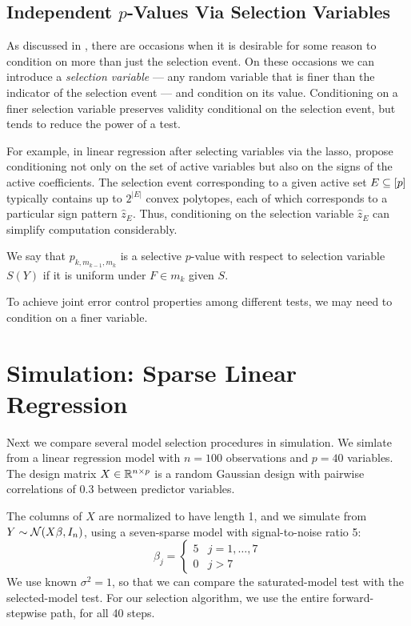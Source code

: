 \documentclass{article}
\begin{document}
\subsection{Independent $p$-Values Via Selection Variables}\label{sec:selectionVariables}

As discussed in \citet{fithian2014optimal}, there are occasions when it is desirable for some reason to condition on more than just the selection event. On these occasions we can introduce a {\em selection variable} --- any random variable that is finer than the indicator of the selection event --- and condition on its value. Conditioning on a finer selection variable preserves validity conditional on the selection event, but tends to reduce the power of a test. 

For example, in linear regression after selecting variables via the lasso, \citet{lee2013exact} propose conditioning not only on the set of active variables but also on the signs of the active coefficients. The selection event corresponding to a given active set $E\subseteq [p]$ typically contains up to $2^{|E|}$ convex polytopes, each of which corresponds to a particular sign pattern $\hat z_E$. Thus, conditioning on the selection variable $\hat z_E$ can simplify computation considerably.

We say that $p_{k,m_{k-1},m_k}$ is a selective $p$-value with respect to selection variable $S(Y)$ if it is uniform under $F\in m_k$ given $S$. 

To achieve joint error control properties among different tests, we may need to condition on a finer variable.


\section{Simulation: Sparse Linear Regression}\label{sec:sparseReg}

Next we compare several model selection procedures in simulation. We simlate from a linear regression model with $n=100$ observations and $p=40$ variables. The design matrix $X\in\mathbb{R}^{n\times p}$ is a random Gaussian design with pairwise correlations of 0.3 between predictor variables.

The columns of $X$ are normalized to have length 1, and we simulate from $Y \sim \mathcal{N}(X\beta,I_n)$, using a seven-sparse model with signal-to-noise ratio 5:
\[
\beta_j = \left\{\begin{matrix}5 & j = 1,\ldots,7\\ 0 &
    j>7\end{matrix}\right.
\]
We use known $\sigma^2=1$, so that we can compare the saturated-model test with the selected-model test. For our selection algorithm, we use the entire forward-stepwise path, for all 40 steps. 
\end{document}
